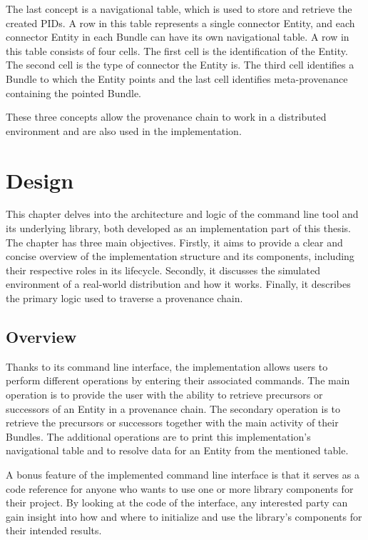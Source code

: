 \documentclass[
  digital,     %
  oneside,     %
  nosansbold,  %
  nocolorbold, %
  lof,         %
  lot,         %
]{fithesis4}
\begin{document}
The last concept is a navigational table, which is used to store and retrieve the created PIDs. A row in this table represents a single connector Entity, and each connector Entity in each Bundle can have its own navigational table. A row in this table consists of four cells. The first cell is the identification of the Entity. The second cell is the type of connector the Entity is. The third cell identifies a Bundle to which the Entity points and the last cell identifies meta-provenance containing the pointed Bundle.

These three concepts allow the provenance chain to work in a distributed environment and are also used in the implementation.


\chapter{Design}
\shorthandoff{-}
This chapter delves into the architecture and logic of the command line tool and its underlying library, both developed as an implementation part of this thesis. The chapter has three main objectives. Firstly, it aims to provide a clear and concise overview of the implementation structure and its components, including their respective roles in its lifecycle. Secondly, it discusses the simulated environment of a real-world distribution and how it works. Finally, it describes the primary logic used to traverse a provenance chain. 
\shorthandon{-}

\section{Overview}
Thanks to its command line interface, the implementation allows users to perform different operations by entering their associated commands. The main operation is to provide the user with the ability to retrieve precursors or successors of an Entity in a provenance chain. The secondary operation is to retrieve the precursors or successors together with the main activity of their Bundles. The additional operations are to print this implementation's navigational table and to resolve data for an Entity from the mentioned table.

A bonus feature of the implemented command line interface is that it serves as a code reference for anyone who wants to use one or more library components for their project. By looking at the code of the interface, any interested party can gain insight into how and where to initialize and use the library's components for their intended results.
\end{document}
